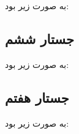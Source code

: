 \documentclass{book}
\begin{document}
به صورت زیر بود:

\begin{latin}
    \footnotesize

\end{latin}


\subsection{جستار ششم}

به صورت زیر بود:

\begin{latin}
    \footnotesize

\end{latin}


\subsection{جستار هفتم}

به صورت زیر بود:

\begin{latin}
    \footnotesize

\end{latin}
\end{document}

